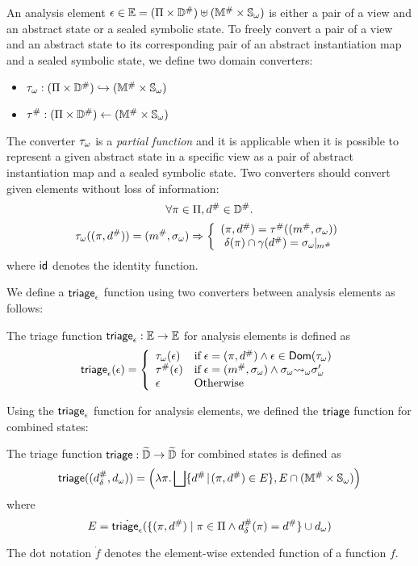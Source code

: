An analysis element $\epsilon \in \mathbb{E} = (\Pi \times {\mathbb{D}}^{\#}) \uplus
({\mathbb{M}}^{\#} \times {\mathbb{S}}_\omega)$ is either a pair of a view and an abstract
state or a sealed symbolic state.  To freely convert a pair of a view and an
abstract state to its corresponding pair of an abstract instantiation map and a
sealed symbolic state, we define two domain converters: \begin{itemize} \item
${\tau}_\omega: (\Pi \times {\mathbb{D}}^{\#}) \hookrightarrow ({\mathbb{M}}^{\#} \times
{\mathbb{S}}_\omega)$ \item ${\tau}^{\#}: (\Pi \times {\mathbb{D}}^{\#}) \leftarrow
({\mathbb{M}}^{\#} \times {\mathbb{S}}_\omega)$ \end{itemize} The converter ${\tau}_\omega$ is a
\textit{partial function} and it is applicable when it is possible to represent
a given abstract state in a specific view as a pair of abstract instantiation
map and a sealed symbolic state.  Two converters should convert given elements
without loss of information:
\[
  \forall \pi \in \Pi, {d}^{\#} \in {\mathbb{D}}^{\#}.
\]
\[
  {\tau}_\omega((\pi, {d}^{\#})) = ({m}^{\#}, {\sigma}_\omega)
  \Rightarrow \left\{
  \begin{array}{l}
    (\pi, {d}^{\#}) = {\tau}^{\#}(({m}^{\#}, {\sigma}_\omega))\\\
    \delta(\pi) \cap \gamma({d}^{\#}) = {\sigma}_\omega\!\!\mid\!\!_{{m}^{\#}}\\
  \end{array}
  \right.
\]
where $\textsf{id}$ denotes the identity function.


We define a $\atriage$ function using two converters between analysis elements
as follows:
\begin{definition}[$\atriage$]
  The triage function $\textsf{triage}_\epsilon: \mathbb{E} \rightarrow \mathbb{E}$ for analysis
  elements is defined as
  \[
    \textsf{triage}_\epsilon(\epsilon) = \left\{
      \begin{array}{ll}
        {\tau}_\omega(\epsilon)
        & \text{if} \; \epsilon = (\pi, {d}^{\#}) \wedge \epsilon \in
        \textsf{Dom}({\tau}_\omega)\\
        {\tau}^{\#}(\epsilon)
        & \text{if} \; \epsilon = ({m}^{\#}, {\sigma}_\omega) \wedge {\sigma}_\omega {\leadsto}_\omega {\sigma}_\omega'\\
        \epsilon
        & \text{Otherwise}
      \end{array}
    \right.
  \]
\end{definition}
Using the $\atriage$ function for analysis elements, we defined the $\triage$
function for combined states:
\begin{definition}[$\triage$]
  The triage function $\textsf{triage}: \widetilde{\mathbb{D}} \rightarrow \widetilde{\mathbb{D}}$ for combined
  states is defined as
  \[
    \textsf{triage}(({d}^{\#}_\delta, {d}_\omega)) = \left(
      \lambda \pi. \bigsqcup \{ {d}^{\#} \!\mid\! (\pi, {d}^{\#}) \in E \},
      E \cap ({\mathbb{M}}^{\#} \times {\mathbb{S}}_\omega)
    \right)
  \]
  where
  \[
    E = \dot{\textsf{triage}_\epsilon}(\{ (\pi, {d}^{\#}) \mid \pi \in \Pi \wedge
    {d}^{\#}_\delta(\pi) = {d}^{\#} \} \cup {d}_\omega)
  \]
\end{definition}
The dot notation $\dot{f}$ denotes the element-wise extended function of a
function $f$.

